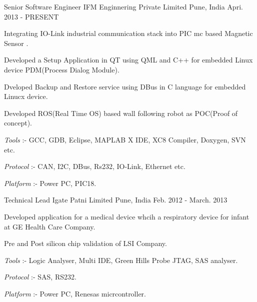 

\begin{cventries}

  \cventry
    {Senior Software Engineer} %
    {IFM Enginnering Private Limited} %
    {Pune, India} %
    {Apri. 2013 - PRESENT} %
    {
      \begin{cvitems} %
        \item {Integrating IO-Link industrial communication stack into PIC mc based Magnetic Sensor .}
        \item {Developed a Setup Application in QT using QML and C++ for embedded Linux device PDM(Process Dialog Module).}
        \item {Dveloped Backup and Restore service using DBus in C language for embedded Linucx device.}
        \item {Developed ROS(Real Time OS) based wall following robot as POC(Proof of concept).}
        \item {\textit{Tools} :- GCC, GDB, Eclipse, MAPLAB X IDE, XC8 Compiler, Doxygen, SVN etc.}
        \item {\textit{Protocol} :- CAN, I2C, DBus, Rs232, IO-Link, Ethernet etc.}
        \item {\textit{Platform} :- Power PC, PIC18.}
      \end{cvitems}
    }

  \cventry
    {Technical Lead} %
    {Igate Patni Limited} %
    {Pune, India} %
    {Feb. 2012 - March. 2013} %
    {
      \begin{cvitems} %
        \item {Developed application for a medical device whcih a respiratory device for infant at GE Health Care Company.}
        \item {Pre and Post silicon chip validation of LSI Company.}
        \item {\textit{Tools} :-  Logic Analyser, Multi IDE, Green Hills Probe JTAG, SAS analyser.}
        \item {\textit{Protocol} :- SAS, RS232.}
        \item {\textit{Platform} :- Power PC, Renesas micrcontroller.}
      \end{cvitems}
    }


\end{cventries}
